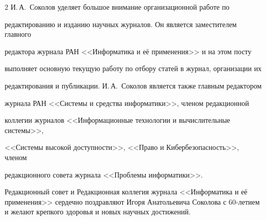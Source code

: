 \begin{multicols}{2}
И.\,А.~Соколов уделяет большое внимание организационной работе по

редактированию и изданию научных журналов. Он является заместителем главного

редактора журнала РАН <<Информатика и её применения>> и на этом посту

выполняет основную текущую работу по отбору статей в журнал, организации их

редактирования и публикации. И.\,А.~Соколов является также главным редактором

журнала РАН <<Системы и средства информатики>>, членом редакционной

коллегии журналов <<Информационные технологии и вычислительные системы>>,

<<Сис\-те\-мы высокой доступности>>, <<Право и Кибер\-без\-опас\-ность>>, членом

редакционного совета журнала <<Проб\-ле\-мы информатики>>.



\bigskip



Редакционный совет и Редакционная коллегия журнала <<Информатика и её применения>> сердечно поздравляют Игоря Анатольевича Соколова с 60-ле\-ти\-ем и желают крепкого здоровья и новых научных достижений.










\end{multicols}




